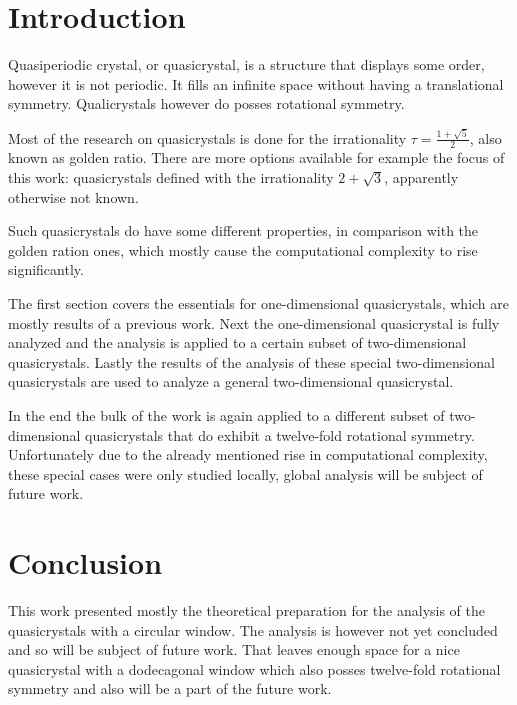 \documentclass[a4paper,10pt,twoside]{article}
\theoremstyle{definition}
\theoremstyle{remark}
\begin{document}
\section*{Introduction}
Quasiperiodic crystal, or quasicrystal, is a structure that displays some order, however it is not periodic. It fills an infinite space without having a translational symmetry. Qualicrystals however do posses rotational symmetry. 

Most of the research on quasicrystals is done for the irrationality $\tau = \frac{1+\sqrt{5}}{2}$, also known as golden ratio. There are more options available for example the focus of this work: quasicrystals defined with the irrationality $2+\sqrt{3}$, apparently otherwise not known.

Such quasicrystals do have some different properties, in comparison with the golden ration ones, which mostly cause the computational complexity to rise significantly. 

The first section covers the essentials for one-dimensional quasicrystals, which are mostly results of a previous work. Next the one-dimensional quasicrystal is fully analyzed and the analysis is applied to a certain subset of two-dimensional quasicrystals. Lastly the results of the analysis of these special two-dimensional quasicrystals are used to analyze a general two-dimensional quasicrystal. 

In the end the bulk of the work is again applied to a different subset of two-dimensional quasicrystals that do exhibit a twelve-fold rotational symmetry. Unfortunately due to the already mentioned rise in computational complexity, these special cases were only studied locally, global analysis will be subject of future work. 
\cleardoublepage
\pagestyle{plain}

\clearpage

\clearpage

\clearpage

\clearpage

\clearpage

\cleardoublepage

\clearpage

\clearpage

\clearpage

\clearpage


\clearpage
\pagestyle{empty}
\section*{Conclusion}
This work presented mostly the theoretical preparation for the analysis of the quasicrystals with a circular window. The analysis is however not yet concluded and so will be subject of future work. That leaves enough space for a nice quasicrystal with a dodecagonal window which also posses twelve-fold rotational symmetry and also will be a part of the future work. 
\end{document}
